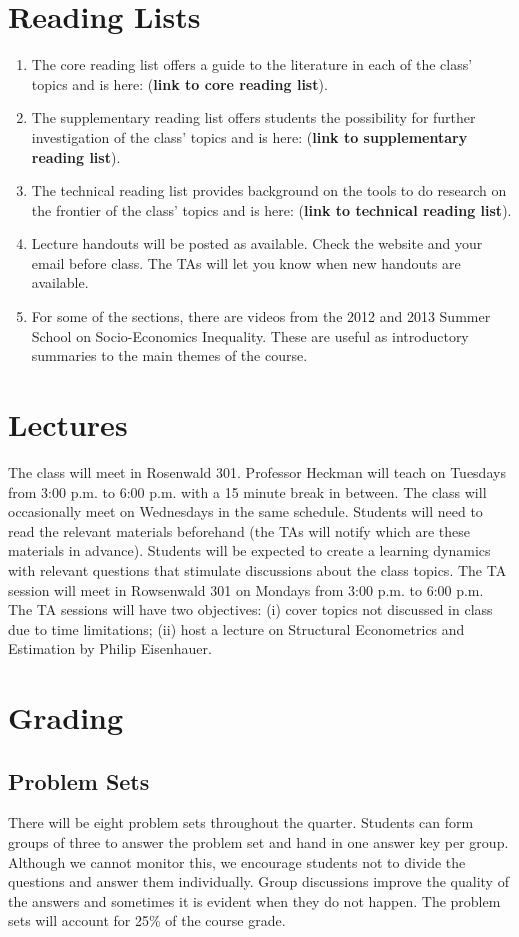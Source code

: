 \documentclass[12pt]{article}
\begin{document}
\section{Reading Lists}
\begin{enumerate}
\item The core reading list offers a guide to the literature in each of the class' topics and  is here: (\textbf{link to core reading list}).
\item The supplementary reading list offers students the possibility for further investigation of the class' topics and is here: (\textbf{link to supplementary reading list}).
\item The technical reading list provides background on the tools to do research on the frontier of the class' topics and is here: (\textbf{link to technical  reading list}).
\item Lecture handouts will be posted as available. Check the website and your email before class. The TAs will let you know when new handouts are available.
\item For some of the sections, there are videos from the 2012 and 2013 Summer School on Socio-Economics Inequality. These are useful as introductory summaries to the main themes of the course.
\end{enumerate}

\section{Lectures}
\noindent The class will meet in Rosenwald 301. Professor Heckman will teach on Tuesdays from 3:00 p.m. to 6:00 p.m. with a 15 minute break in between. The class will occasionally meet on Wednesdays in the same schedule. Students will need to read the relevant materials beforehand (the TAs will notify which are these materials in advance). Students will be expected to create a learning dynamics with relevant questions that stimulate discussions about the class topics. The TA session will meet in Rowsenwald 301 on Mondays from 3:00 p.m. to 6:00 p.m. The TA sessions will have two objectives: (i) cover topics not discussed in class due to time limitations; (ii) host a lecture on Structural Econometrics and Estimation by Philip Eisenhauer.

\section{Grading}
\subsection{Problem Sets}
\noindent There will be eight problem sets throughout the quarter. Students can form groups of three to answer the problem set and hand in one answer key per group. Although we cannot monitor this, we encourage students not to divide the questions and answer them individually. Group discussions improve the quality of the answers and sometimes it is evident when they do not happen. The problem sets will account for 25\% of the course grade. 
\end{document}
